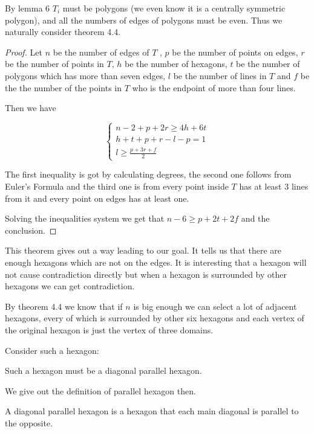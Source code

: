 \begin{rem}
	By lemma 6 $T_i$ must be polygons (we even know it is a centrally 
	symmetric polygon), and all the numbers of edges of polygons must
	be even. Thus we naturally consider theorem 4.4. 
\end{rem}

\begin{proof}
	Let $n$ be the number of edges of $T$ , $p$ be the number of points
	on edges, $r$ be the number of points in $T$, $h$ be the number of 
	hexagons, $t$ be the number of polygons which has more than seven 
	edges, $l$ be the number of lines in $T$ and $f$ be the the number of 
	the points in $T$ who is the endpoint of more than four lines.
	
	Then we have
	
	\[
	\begin{cases}
	n - 2 + p + 2r \geq 4h + 6t\\
	h + t + p + r - l - p = 1 \\
	l \geq \frac{p + 3r + f}{2}
	\end{cases}
	\]
	
	The first inequality is got by calculating degrees,
	the second one follows from Euler's Formula and the third one 
	is from every point inside $T$ has at least 3 lines from it 
	and every point on edges has at least one.
	
	Solving the inequalities system we get that $n - 6 \geq p + 2t + 2f$ and
	the conclusion.
\end{proof}	

This theorem gives out a way leading to our goal. It tells us 
that there are enough hexagons which are not on the edges. It is 
interesting that a hexagon will not cause contradiction directly 
but when a hexagon is surrounded by other hexagons we can get 
contradiction.


By theorem 4.4 we know that if $n$ is big enough we can select a 
lot of adjacent hexagons, every of which is surrounded by other 
six hexagons and each vertex of the original hexagon is just the
vertex of three domains.

Consider such a hexagon:

\begin{thm}
	Such a hexagon must be a diagonal parallel hexagon.
\end{thm}	 

We give out the definition of parallel hexagon then.

\begin{defn}
	A diagonal parallel hexagon is a hexagon that each main 
	diagonal is parallel to the opposite.
\end{defn}


